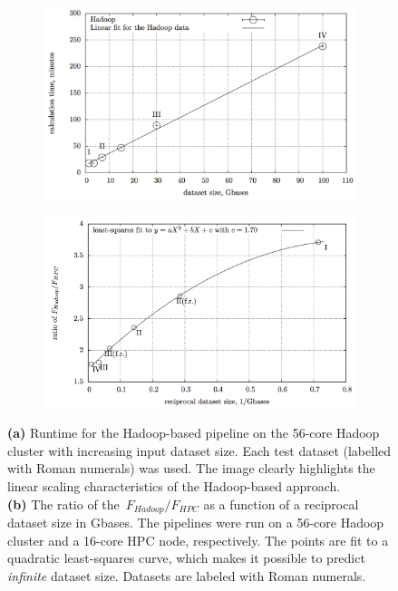 \documentclass{bioinfo}
\begin{document}
\begin{methods}
\begin{enumerate}[(1)]
\end{enumerate}

\begin{figure}[!hb]

 \begin{subfigure}[b]{0.48\textwidth}
    \includegraphics[width=\textwidth]{figures/fig1-sep.png}
	\caption{}
		\label{fig:fig1}
        \end{subfigure}%
 \begin{subfigure}[b]{0.48\textwidth}
    \includegraphics[width=\textwidth]{figures/fig2-sep.png}
	\caption{}
	\label{fig:fig2}
        \end{subfigure}
	\caption{
	\textbf{(a)} Runtime for the Hadoop-based pipeline on the 56-core Hadoop cluster with
	increasing input dataset size. Each test dataset (labelled with Roman
	numerals) was used. The image clearly highlights the linear scaling
	characteristics of the Hadoop-based approach.\\
	\textbf{(b)} The ratio of the~$F_{Hadoop}/F_{HPC}$ as a function of a reciprocal
	dataset size in Gbases. The pipelines were run on a 56-core Hadoop cluster and
	a 16-core HPC node, respectively.
	The points are fit to a quadratic least-squares curve, which makes it possible
	to predict {\it infinite} dataset size. Datasets are labeled with Roman
	numerals.
		}
\end{figure}




\end{methods}
\end{document}
